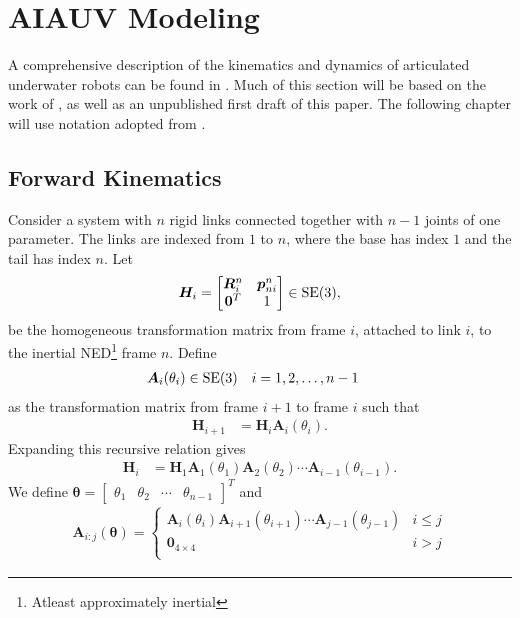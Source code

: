 \newpage
\section{AIAUV Modeling}

A comprehensive description of the kinematics and dynamics of articulated
underwater robots can be found in \cite{schmidt2018}. Much of this section
will be based on the work of \cite{schmidt2018}, as well as an unpublished
first draft of this paper. The following chapter will use notation adopted from
\cite{from2014}.

\subsection{Forward Kinematics}
\label{sec:forward_kinematics}
Consider a system with $n$ rigid links connected together with $n-1$ joints
of one parameter. The links are indexed from $1$ to $n$, where the base
has index $1$ and the tail has index $n$. Let
\begin{align}
    \bm{H}_i = \begin{bmatrix}
        \bm{R}_i^n & \bm{p}_{ni}^n \\
        \bm{0}^T & 1
    \end{bmatrix} \in \operatorname{SE}(3),
\end{align}
be the homogeneous transformation matrix from frame $i$, attached to link $i$,
to the inertial NED\footnote{Atleast approximately inertial} frame $n$. Define
\begin{align}
    \bm{A}_i(\theta_i) &\in \operatorname{SE}(3) & i &= 1, 2, \ldots, n-1
\end{align}
as the transformation matrix from frame $i+1$ to frame $i$ such that
\begin{align}
    \bm{H}_{i+1} &= \bm{H}_i \bm{A}_i(\theta_i).
\end{align}
Expanding this recursive relation gives
\begin{align}
    \bm{H}_i &= \bm{H}_1 \bm{A}_1(\theta_1) \bm{A}_2(\theta_2) \cdots \bm{A}_{i-1}(\theta_{i-1}).
\end{align}
We define $\bm{\theta} = \begin{bmatrix}\theta_1 & \theta_2 & \cdots & \theta_{n-1}\end{bmatrix}^T$
and
\begin{align}
    \bm{A}_{i:j}(\bm{\theta}) =
    \begin{cases}
        \bm{A}_i(\theta_i) \bm{A}_{i+1}(\theta_{i+1}) \cdots \bm{A}_{j-1}(\theta_{j-1}) & i \leq j \\
        \bm{0}_{4 \times 4} & i > j \\
    \end{cases}
\end{align}

